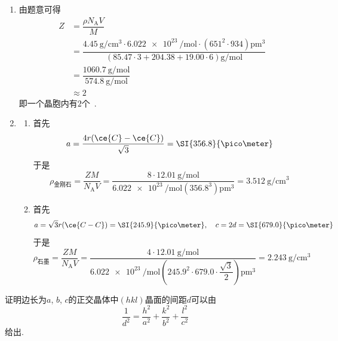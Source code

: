 \documentclass{ctexart}
\begin{document}
\begin{solution}
\begin{enumerate}[label=\tbf{(\alph*)}]
\[\begin{aligned}
            &\approx2
        \end{aligned}\]
        即一个晶胞内有$2$个二水合草酸.
        \item 由题意可得
        \[\begin{aligned}
            Z
            &=\dfrac{\rho N_{\text{A}}V}{M}\\
            &=\dfrac{\SI{4.45}{\gram\per\centi\meter^3}\cdot\SI{6.022e23}{\per\mole}\cdot(651^2\cdot934)\si{\pico\meter^3}}{(85.47\cdot3+204.38+19.00\cdot6)\si{\gram\per\mol}}\\
            &=\dfrac{\SI{1060.7}{\gram\per\mole}}{\SI{574.8}{\gram\per\mole}}\\
            &\approx2
        \end{aligned}\]
        即一个晶胞内有$2$个~.
        \item \begin{enumerate}[label=\tbf{(\roman*)}]
            \item 首先
            \[a=\dfrac{4r(\ce{C}-\ce{C})}{\sqrt{3}}=\SI{356.8}{\pico\meter}\]
            于是
            \[\rho_{\text{金刚石}}=\dfrac{ZM}{N_{\text{A}}V}=\dfrac{8\cdot\SI{12.01}{\gram\per\mole}}{\SI{6.022e23}{\per\mole}(356.8^3)\si{\pico\meter^3}}=\SI{3.512}{\gram\per\centi\meter^3}\]
            \item 首先
            \[a=\sqrt{3}r(\ce{C-C})=\SI{245.9}{\pico\meter},\quad c=2d=\SI{679.0}{\pico\meter}\]
            于是
            \[\rho_{\text{石墨}}=\dfrac{ZM}{N_{\text{A}}V}=\dfrac{4\cdot\SI{12.01}{\gram\per\mole}}{\SI{6.022e23}{\per\mole}\left(245.9^2\cdot679.0\cdot\dfrac{\sqrt3}{2}\right)\si{\pico\meter^3}}=\SI{2.243}{\gram\per\centi\meter^3}\]
        \end{enumerate}
    \end{enumerate}
\end{solution}
\begin{homework}[10.]
    证明边长为$a$, $b$, $c$的正交晶体中$(hkl)$晶面的间距$d$可以由
    \[\dfrac{1}{d^2}=\dfrac{h^2}{a^2}+\dfrac{k^2}{b^2}+\dfrac{l^2}{c^2}\]
    给出.
\end{homework}
\end{document}
